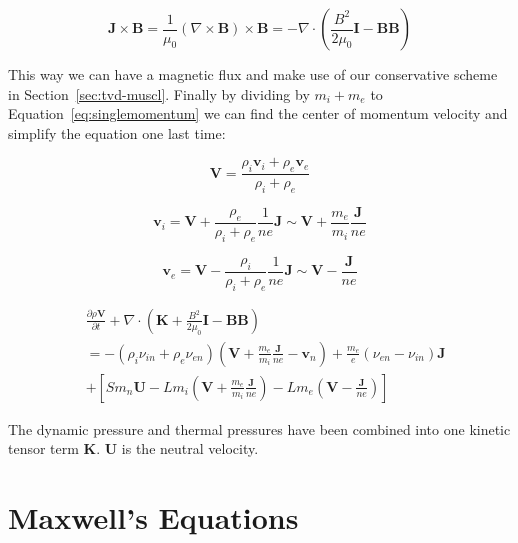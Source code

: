 \documentclass[12pt,upcase]{umlthesis}
\begin{document}
\begin{equation}
	\textbf{J} \times \textbf{B} = \frac{1}{\mu_0} (\nabla \times \textbf{B}) \times \textbf{B} = -\nabla \cdot (\frac{B^2}{2\mu_0}\textbf{I} - \textbf{BB})
\end{equation}

This way we can have a magnetic flux and make use of our conservative scheme in Section~\ref{sec:tvd-muscl}. Finally by dividing by $m_i+m_e$ to Equation~\ref{eq:singlemomentum} we can find the center of momentum velocity and simplify the equation one last time:

\begin{equation}
	\textbf{V} = \frac{\rho_i \textbf{v}_i + \rho_e \textbf{v}_e}{\rho_i+\rho_e}
\end{equation}

\begin{equation}\label{eq:vi}
	\textbf{v}_i = \textbf{V} + \frac{\rho_e}{\rho_i+\rho_e} \frac{1}{n e} \textbf{J} \sim \textbf{V} + \frac{m_e}{m_i} \frac{\textbf{J}}{n e} 
\end{equation}

\begin{equation}\label{eq:ve}
	\textbf{v}_e = \textbf{V} - \frac{\rho_i}{\rho_i+\rho_e} \frac{1}{n e} \textbf{J} \sim \textbf{V} -\frac{\textbf{J} }{n e}
\end{equation}

\begin{equation}\label{eq:momentumcom}
\begin{aligned}
	&\frac{\partial \rho \textbf{V}}{\partial t} + \nabla \cdot (\textbf{K} + \frac{B^2}{2\mu_0}\textbf{I} - \textbf{BB}) \\
	&= - (\rho_i \nu_{in} + \rho_e \nu_{en})(\textbf{V} + \frac{m_e}{m_i} \frac{\textbf{J}}{n e} - \textbf{v}_n) + \frac{m_e}{e}(\nu_{en}-\nu_{in}) \textbf{J} \\
	& + [S m_n \textbf{U} - L m_i (\textbf{V} + \frac{m_e}{m_i} \frac{\textbf{J}}{n e})- L m_e (\textbf{V} -\frac{\textbf{J}}{n e})]
\end{aligned}
\end{equation}

The dynamic pressure and thermal pressures have been combined into one kinetic tensor term $\textbf{K}$. $\textbf{U}$ is the neutral velocity.

\section{Maxwell's Equations}
\end{document}
